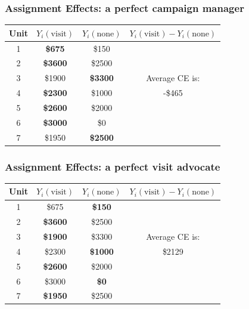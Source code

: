 \documentclass[aspectratio=169]{beamer}
\theoremstyle{principle}
\begin{document}
\begin{frame}
\frametitle{Assignment Effects: a perfect campaign manager}
\huge
\begin{table}
\begin{tabular}{ c | c | c | c}
Unit & $Y_i(\mbox{visit})$ & $Y_i(\mbox{none})$ & \color{white}$Y_i(\mbox{visit}) - Y_i(\mbox{none})$ \\
\hline
\hline
  1 & \textbf{\$675} & \color{gray}\$150 & \\
  2 & \textbf{\$3600} & \color{gray}\$2500 & \\
  3 & \color{gray}\$1900 & \textbf{\$3300} &Average CE is: \\
  4 & \textbf{\$2300} & \color{gray}\$1000 & -\$465\\
  5 & \textbf{\$2600} & \color{gray}\$2000 & \\
  6 & \textbf{\$3000} & \color{gray}\$0 & \\
  7 & \color{gray}\$1950 & \textbf{\$2500} & \\
\hline
\hline
\end{tabular}
\end{table}

\end{frame}

\begin{frame}
\frametitle{Assignment Effects: a perfect visit advocate}
\huge
\begin{table}
\begin{tabular}{ c | c | c | c}
Unit & $Y_i(\mbox{visit})$ & $Y_i(\mbox{none})$ & \color{white}$Y_i(\mbox{visit}) - Y_i(\mbox{none})$ \\
\hline
\hline
  1 & \color{gray}\$675 & \textbf{\$150} & \\
  2 & \textbf{\$3600} & \color{gray}\$2500 & \\
  3 & \textbf{\$1900} & \color{gray}\$3300 &Average CE is: \\
  4 & \color{gray}\$2300 & \textbf{\$1000} & \$2129\\
  5 & \textbf{\$2600} & \color{gray}\$2000 & \\
  6 & \color{gray}\$3000 & \textbf{\$0} & \\
  7 & \textbf{\$1950} & \color{gray}\$2500 & \\
\hline
\hline
\end{tabular}
\end{table}

\end{frame}
\end{document}
